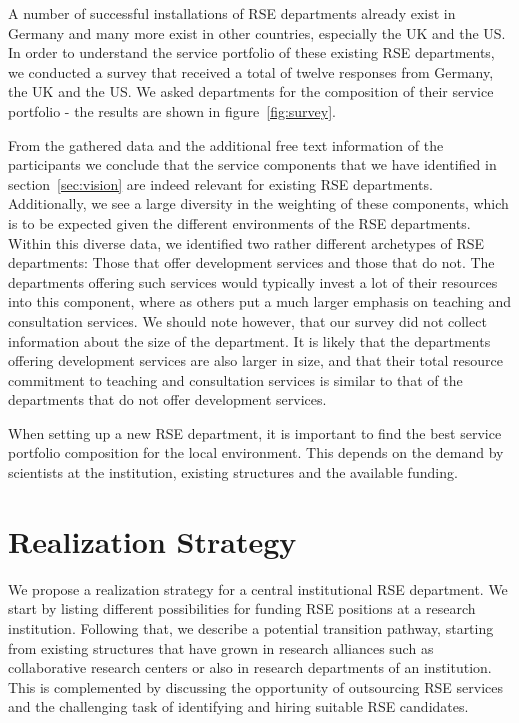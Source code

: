 \documentclass[a4paper]{article}
\begin{document}
A number of successful installations of RSE departments already exist in Germany and many more exist in other countries, especially the UK and the US.
In order to understand the service portfolio of these existing RSE departments, we conducted a survey that received a total of twelve responses from Germany, the UK and the US.
We asked departments for the composition of their service portfolio - the results are shown in figure~\ref{fig:survey}.

From the gathered data and the additional free text information of the participants we conclude that the service components that we have identified in section~\ref{sec:vision} are indeed relevant for existing RSE departments.
Additionally, we see a large diversity in the weighting of these components, which is to be expected given the different environments of the RSE departments.
Within this diverse data, we identified two rather different archetypes of RSE departments: Those that offer development services and those that do not.
The departments offering such services would typically invest a lot of their resources into this component, where as others put a much larger emphasis on teaching and consultation services.
We should note however, that our survey did not collect information about the size of the department.
It is likely that the departments offering development services are also larger in size,
and that their total resource commitment to teaching and consultation services is similar to that of the departments that do not offer development services.

When setting up a new RSE department, it is important to find the best service portfolio composition for the local environment.
This depends on the demand by scientists at the institution, existing structures and the available funding.

\section{Realization Strategy}
\label{sec:realization}

We propose a realization strategy for a central institutional RSE department.
We start by listing different possibilities for funding RSE positions at a research institution.
Following that, we describe a potential transition pathway, starting from existing structures that have grown in research alliances such as collaborative research centers or also in research departments of an institution.
This is complemented by discussing the opportunity of outsourcing RSE services and the challenging task of identifying and hiring suitable RSE candidates.
\end{document}
